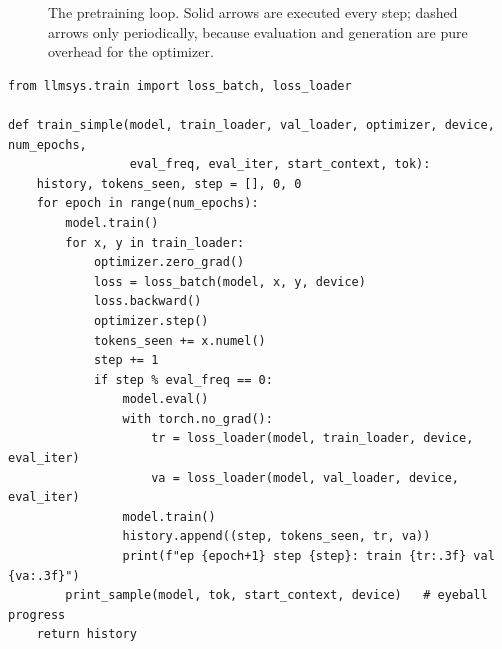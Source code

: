 \begin{figure}[t]
\centering
{}
\caption{The pretraining loop. Solid arrows are executed every step; dashed arrows only
periodically, because evaluation and generation are pure overhead for the optimizer.}
\label{fig:pretrain:loop}
\end{figure}

\begin{lstlisting}[caption={A minimal pretraining loop with periodic evaluation.},label={lst:pretrain:simple}]
from llmsys.train import loss_batch, loss_loader

def train_simple(model, train_loader, val_loader, optimizer, device, num_epochs,
                 eval_freq, eval_iter, start_context, tok):
    history, tokens_seen, step = [], 0, 0
    for epoch in range(num_epochs):
        model.train()
        for x, y in train_loader:
            optimizer.zero_grad()
            loss = loss_batch(model, x, y, device)
            loss.backward()
            optimizer.step()
            tokens_seen += x.numel()
            step += 1
            if step % eval_freq == 0:
                model.eval()
                with torch.no_grad():
                    tr = loss_loader(model, train_loader, device, eval_iter)
                    va = loss_loader(model, val_loader, device, eval_iter)
                model.train()
                history.append((step, tokens_seen, tr, va))
                print(f"ep {epoch+1} step {step}: train {tr:.3f} val {va:.3f}")
        print_sample(model, tok, start_context, device)   # eyeball progress
    return history
\end{lstlisting}

